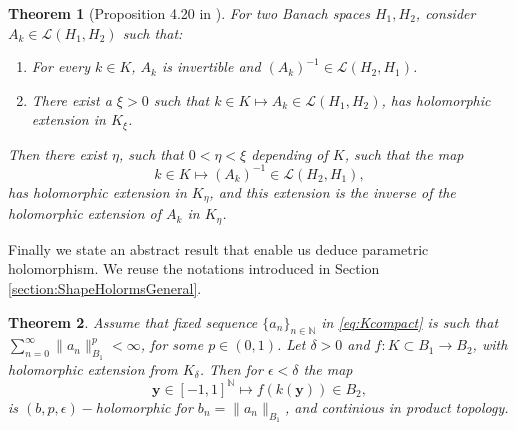 \documentclass{article}
\newtheorem{theorem}{Theorem}[section]
\newcommand{\IN}{{\mathbb N}}
\newcommand{\by}{\bm{y}}
\begin{document}
\begin{theorem}[Proposition 4.20 in \cite{Henriquez2021}]
\label{thrm:abtractinverse}For two Banach spaces $H_1,H_2$,
consider $A_k \in \mathcal{L}(H_1,H_2)$ such that: 
\begin{enumerate}
\item 
For every $k \in K$, $A_k$ is invertible and $(A_k)^{-1} \in \mathcal{L}(H_2,H_1)$. 
\item 
There exist a $\xi >0$ such that $k \in K \mapsto A_k \in \mathcal{L}(H_1,H_2)$, has holomorphic extension in $K_\xi$.
\end{enumerate}
Then there exist $\eta$, such that $0<\eta<\xi$ depending of $K$, such that the map 
$$k \in K \mapsto (A_{k})^{-1} \in \mathcal{L}(H_2,H_1),$$ has holomorphic extension in $K_\eta$, and this extension is the inverse of the holomorphic extension of $A_k$ in $K_\eta$.
\end{theorem} 
Finally we state an abstract result that enable us deduce parametric holomorphism. We reuse the notations introduced in Section \ref{section:ShapeHolormsGeneral}.
\begin{theorem}
\label{theorem:generalbpeholomrfsm}
Assume that fixed sequence $\{a_n\}_{n \in \IN}$ in \eqref{eq:Kcompact} is  such that $\sum_{n=0}^\infty \| a_n \|^p_{B_1} <\infty$, for some $p \in (0,1)$. 
Let $\delta>0$ and $f : K \subset B_1 \rightarrow B_2$, with holomorphic extension from $K_\delta$. Then for $\epsilon < \delta$ the map 
$$ \by \in [-1,1]^{\IN} \mapsto f(k(\by)) \in B_2,$$
is $(b,p,\epsilon)-$holomorphic for $b_n = \|a_n\|_{B_1}$, and continious in product topology.
\end{theorem}
\end{document}
